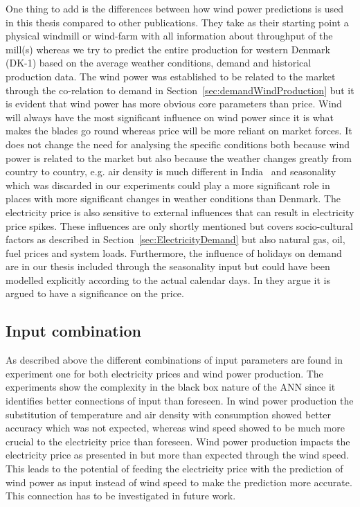 One thing to add is the differences between how wind power predictions is used in this thesis compared to other publications. They take as their starting point a physical windmill or wind-farm with all information about throughput of the mill(s)\cite{windForecastPortugal,ShortTermWindPowerForecasting,dayAheadImpactOfWindPowerForecasts,WindPowerGenerationUsingANN} whereas we try to predict the entire production for western Denmark (DK-1) based on the average weather conditions, demand and historical production data. The wind power was established to be related to the market through the co-relation to demand in Section~\ref{sec:demandWindProduction} but it is evident that wind power has more obvious core parameters than price. Wind will always have the most significant influence on wind power since it is what makes the blades go round whereas price will be more reliant on market forces. It does not change the need for analysing the specific conditions both because wind power is related to the market but also because the weather changes greatly from country to country, e.g. air density is much different in India~\cite{WindPowerGenerationUsingANN} and seasonality which was discarded in our experiments could play a more significant role in places with more significant changes in weather conditions than Denmark. The electricity price is also sensitive to external influences that can result in electricity price spikes\cite{singhal2011electricity}. These influences are only shortly mentioned but covers socio-cultural factors as described in Section~\ref{sec:ElectricityDemand} but also natural gas, oil, fuel prices and system loads\cite{singhal2011electricity}. Furthermore, the influence of holidays on demand are in our thesis included through the seasonality input but could have been modelled explicitly according to the actual calendar days. In \cite{EnergyPriceForecasting,chen2004load} they argue it is argued to have a significance on the price.

\subsection{Input combination}
As described above the different combinations of input parameters are found in experiment one for both electricity prices and wind power production. The experiments show the complexity in the black box nature of the ANN since it identifies better connections of input than foreseen. In wind power production the substitution of temperature and air density with consumption showed better accuracy which was not expected, whereas wind speed showed to be much more crucial to the electricity price than foreseen. Wind power production impacts the electricity price as presented in \cite{dayAheadImpactOfWindPowerForecasts} but more than expected through the wind speed. This leads to the potential of feeding the electricity price with the prediction of wind power as input instead of wind speed to make the prediction more accurate. This connection has to be investigated in future work.

